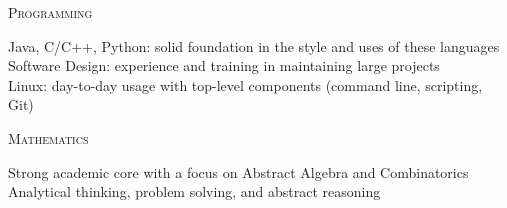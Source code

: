 \documentclass[letterpaper,10pt]{article}
\newenvironment{resumecols1}[1]
{
    \vspace{.1cm}
    \begin{minipage}[t]{.21\linewidth}
        \begin{flushright}
            \textsc{#1}
        \end{flushright}
    \end{minipage}
    \hspace{.005\linewidth}
    \begin{minipage}[t]{.77\linewidth}
}
{
    \end{minipage}
    \vspace{.1cm}
}
\begin{document}
\begin{resumecols1}{Programming}
    Java, C/C++, Python: solid foundation in the style and uses of these languages \\
    Software Design: experience and training in maintaining large projects \\
    Linux: day-to-day usage with top-level components (command line, scripting, Git)
\end{resumecols1}

\begin{resumecols1}{Mathematics}
    Strong academic core with a focus on Abstract Algebra and Combinatorics \\
    Analytical thinking, problem solving, and abstract reasoning
\end{resumecols1}
\end{document}
